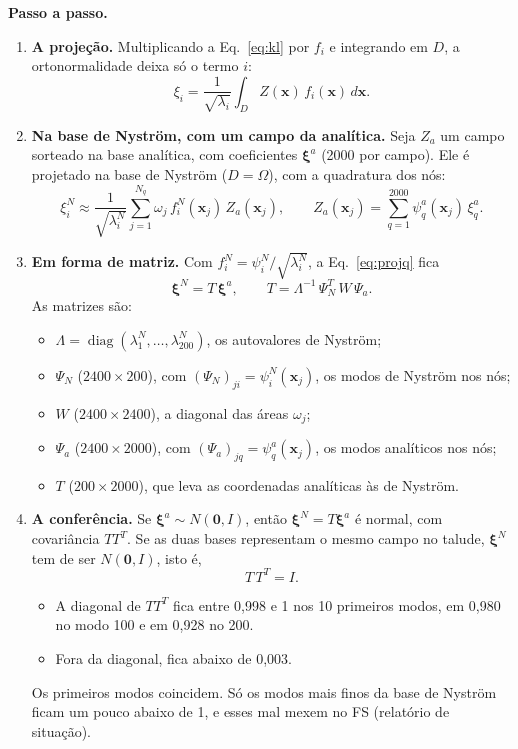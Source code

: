 \documentclass[11pt,a4paper]{article}
\newcommand{\xib}{\bm\xi}
\begin{document}
\textbf{Passo a passo.}
\begin{enumerate}
  \item \textbf{A projeção.} Multiplicando a Eq.~\eqref{eq:kl} por $f_i$ e integrando em $D$, a ortonormalidade deixa
    só o termo $i$:
    \begin{equation}
      \xi_i = \frac{1}{\sqrt{\lambda_i}}\int_D Z(\bm x)\,f_i(\bm x)\,d\bm x.
      \label{eq:proj}
    \end{equation}
  \item \textbf{Na base de Nyström, com um campo da analítica.} Seja $Z_a$ um campo sorteado na base analítica, com
    coeficientes $\xib^a$ (2000 por campo). Ele é projetado na base de Nyström ($D = \Omega$), com a quadratura dos nós:
    \begin{equation}
      \xi^N_i \approx \frac{1}{\sqrt{\lambda^N_i}}\sum_{j=1}^{N_q}\omega_j\,f^N_i(\bm x_j)\,Z_a(\bm x_j), \qquad
      Z_a(\bm x_j) = \sum_{q=1}^{2000}\psi^a_q(\bm x_j)\,\xi^a_q.
      \label{eq:projq}
    \end{equation}
  \item \textbf{Em forma de matriz.} Com $f^N_i = \psi^N_i/\sqrt{\lambda^N_i}$, a Eq.~\eqref{eq:projq} fica
    \begin{equation}
      \xib^N = T\,\xib^a, \qquad T = \Lambda^{-1}\,\Psi_N^{T}\,W\,\Psi_a.
      \label{eq:T}
    \end{equation}
    As matrizes são:
    \begin{itemize}
      \item $\Lambda = \operatorname{diag}(\lambda^N_1, \dots, \lambda^N_{200})$, os autovalores de Nyström;
      \item $\Psi_N$ ($2400\times200$), com $(\Psi_N)_{ji} = \psi^N_i(\bm x_j)$, os modos de Nyström nos nós;
      \item $W$ ($2400\times2400$), a diagonal das áreas $\omega_j$;
      \item $\Psi_a$ ($2400\times2000$), com $(\Psi_a)_{jq} = \psi^a_q(\bm x_j)$, os modos analíticos nos nós;
      \item $T$ ($200\times2000$), que leva as coordenadas analíticas às de Nyström.
    \end{itemize}
  \item \textbf{A conferência.} Se $\xib^a \sim N(\bm 0, I)$, então $\xib^N = T\xib^a$ é normal, com covariância $TT^T$. Se
    as duas bases representam o mesmo campo no talude, $\xib^N$ tem de ser $N(\bm 0, I)$, isto é,
    \begin{equation}
      T\,T^T = I.
      \label{eq:TTt}
    \end{equation}
    \begin{itemize}
      \item A diagonal de $TT^T$ fica entre 0,998 e 1 nos 10 primeiros modos, em 0,980 no modo 100 e em 0,928 no 200.
      \item Fora da diagonal, fica abaixo de 0,003.
    \end{itemize}
    Os primeiros modos coincidem. Só os modos mais finos da base de Nyström ficam um pouco abaixo de 1, e esses mal
    mexem no FS (relatório de situação).
\end{enumerate}
\end{document}
